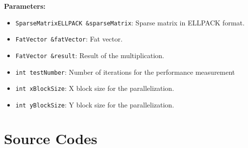 \documentclass[12pt,oneside]{book} %
\begin{document}
\begin{subappendices}
    \textbf{Parameters:}
    \begin{itemize}
        \item \texttt{SparseMatrixELLPACK \&sparseMatrix}: Sparse matrix in ELLPACK format.
        \item \texttt{FatVector \&fatVector}: Fat vector.
        \item \texttt{FatVector \&result}: Result of the multiplication.
        \item \texttt{int testNumber}: Number of iterations for the performance measurement
        \item \texttt{int xBlockSize}: X block size for the parallelization.
        \item \texttt{int yBlockSize}: Y block size for the parallelization.
    \end{itemize}

\end{subappendices}

\chapter{Source Codes}

\end{document}
